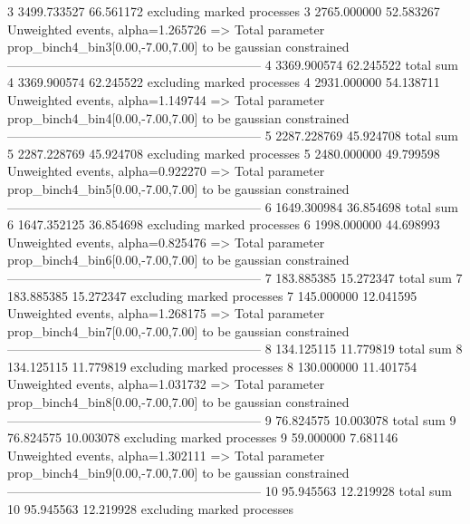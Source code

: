 3          3499.733527     66.561172       excluding marked processes    
3          2765.000000     52.583267       Unweighted events, alpha=1.265726
  => Total parameter prop_binch4_bin3[0.00,-7.00,7.00] to be gaussian constrained
------------------------------------------------------------
4          3369.900574     62.245522       total sum                     
4          3369.900574     62.245522       excluding marked processes    
4          2931.000000     54.138711       Unweighted events, alpha=1.149744
  => Total parameter prop_binch4_bin4[0.00,-7.00,7.00] to be gaussian constrained
------------------------------------------------------------
5          2287.228769     45.924708       total sum                     
5          2287.228769     45.924708       excluding marked processes    
5          2480.000000     49.799598       Unweighted events, alpha=0.922270
  => Total parameter prop_binch4_bin5[0.00,-7.00,7.00] to be gaussian constrained
------------------------------------------------------------
6          1649.300984     36.854698       total sum                     
6          1647.352125     36.854698       excluding marked processes    
6          1998.000000     44.698993       Unweighted events, alpha=0.825476
  => Total parameter prop_binch4_bin6[0.00,-7.00,7.00] to be gaussian constrained
------------------------------------------------------------
7          183.885385      15.272347       total sum                     
7          183.885385      15.272347       excluding marked processes    
7          145.000000      12.041595       Unweighted events, alpha=1.268175
  => Total parameter prop_binch4_bin7[0.00,-7.00,7.00] to be gaussian constrained
------------------------------------------------------------
8          134.125115      11.779819       total sum                     
8          134.125115      11.779819       excluding marked processes    
8          130.000000      11.401754       Unweighted events, alpha=1.031732
  => Total parameter prop_binch4_bin8[0.00,-7.00,7.00] to be gaussian constrained
------------------------------------------------------------
9          76.824575       10.003078       total sum                     
9          76.824575       10.003078       excluding marked processes    
9          59.000000       7.681146        Unweighted events, alpha=1.302111
  => Total parameter prop_binch4_bin9[0.00,-7.00,7.00] to be gaussian constrained
------------------------------------------------------------
10         95.945563       12.219928       total sum                     
10         95.945563       12.219928       excluding marked processes    
